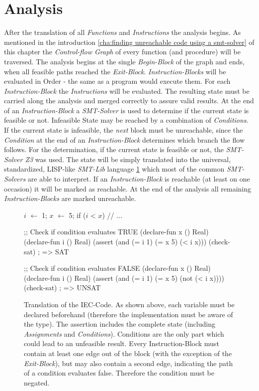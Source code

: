 \section{Analysis}
\label{sec:analysis}
After the translation of all \emph{Functions} and \emph{Instructions} the analysis begins. As mentioned in the introduction \ref{cha:finding unreachable code using a smt-solver} of this chapter the \emph{Control-flow Graph} of every function (and procedure) will be traversed. The analysis begins at the single \emph{Begin-Block} of the graph and ends, when all feasible paths reached the \emph{Exit-Block}. \emph{Instruction-Blocks} will be evaluated in Order - the same as a program would execute them. 
For each \emph{Instruction-Block} the \emph{Instructions} will be evaluated. The resulting state must be carried along the analysis and merged correctly to assure valid results. At the end of an \emph{Instruction-Block} a \emph{SMT-Solver} is used to determine if the current state is feasible or not. Infeasible State may be reached by a combination of \emph{Conditions}. If the current state is infeasible, the \emph{next} block must be unreachable, since the \emph{Condition} at the end of an \emph{Instruction-Block} determines which branch the flow follows. 
For the determination, if the current state is feasible or not, the \emph{SMT-Solver Z3}\cite{demouraZ3EfficientSMT2008} was used. The state will be simply translated into the universal, standardized, LISP-like \emph{SMT-Lib} language \ref{code:translation} which most of the common \emph{SMT-Solvers} are able to interpret. 
If an \emph{Instruction-Block} is reachable (at least on one occasion) it will be marked as reachable. At the end of the analysis all remaining \emph{Instruction-Blocks} are marked unreachable.
\begin{figure}[h!]
	\begin{GenericCode}
		$i$ $\leftarrow$ 1;
		$x$ $\leftarrow$ 5;
		if ($i$ < $x$) {
			// ...
		}
	\end{GenericCode}
	\begin{GenericCode}
		;; Check if condition evaluates TRUE
		(declare-fun x () Real)
		(declare-fun i () Real)
		(assert (and (= i 1) (= x 5) (< i x)))
		(check-sat)
		; => SAT
	\end{GenericCode}
	\begin{GenericCode}
		;; Check if condition evaluates FALSE	
		(declare-fun x () Real)
		(declare-fun i () Real)
		(assert (and (= i 1) (= x 5) (not (< i x))))
		(check-sat)
		; => UNSAT
	\end{GenericCode}
	\caption{Translation of the IEC-Code. As shown above, each variable must be declared beforehand (therefore the implementation must be aware of the type). The assertion includes the complete state (including \emph{Assignments} and \emph{Conditions}). Conditions are the only part which could lead to an unfeasible result. Every Instruction-Block must contain at least one edge out of the block (with the exception of the \emph{Exit-Block}), but may also contain a second edge, indicating the path of a condition evaluates false. Therefore the condition must be negated.}
	\label{code:translation}
\end{figure}

